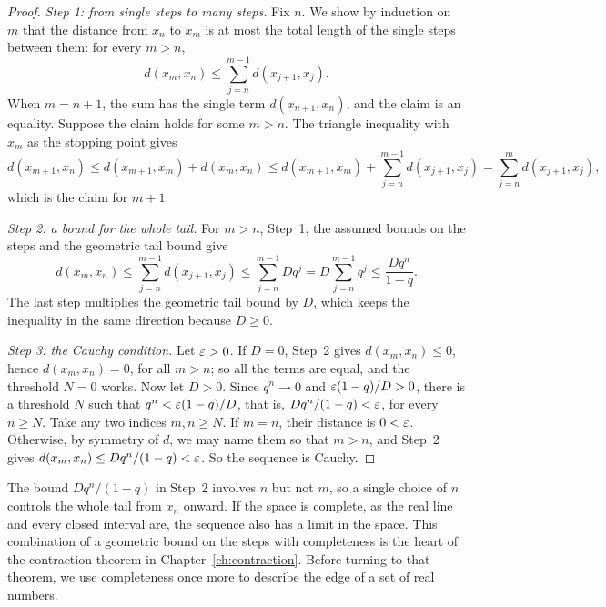\begin{proof}
\emph{Step 1: from single steps to many steps.} Fix $n$. We show by induction on $m$ that the distance from $x_n$ to $x_m$ is at most the total length of the single steps between them: for every $m>n$,
\[
d(x_m,x_n)\le\sum_{j=n}^{m-1}d(x_{j+1},x_j).
\]
When $m=n+1$, the sum has the single term $d(x_{n+1},x_n)$, and the claim is an equality. Suppose the claim holds for some $m>n$. The triangle inequality with $x_m$ as the stopping point gives
\[
d(x_{m+1},x_n)\le d(x_{m+1},x_m)+d(x_m,x_n)\le d(x_{m+1},x_m)+\sum_{j=n}^{m-1}d(x_{j+1},x_j)=\sum_{j=n}^{m}d(x_{j+1},x_j),
\]
which is the claim for $m+1$.

\emph{Step 2: a bound for the whole tail.} For $m>n$, Step~1, the assumed bounds on the steps and the geometric tail bound give
\[
d(x_m,x_n)\le\sum_{j=n}^{m-1}d(x_{j+1},x_j)\le\sum_{j=n}^{m-1}Dq^j=D\sum_{j=n}^{m-1}q^j\le\frac{Dq^n}{1-q}.
\]
The last step multiplies the geometric tail bound by $D$, which keeps the inequality in the same direction because $D\ge0$.

\emph{Step 3: the Cauchy condition.} Let $\varepsilon>0$. If $D=0$, Step~2 gives $d(x_m,x_n)\le0$, hence $d(x_m,x_n)=0$, for all $m>n$; so all the terms are equal, and the threshold $N=0$ works. Now let $D>0$. Since $q^n\to0$ and $\varepsilon(1-q)/D>0$, there is a threshold $N$ such that $q^n<\varepsilon(1-q)/D$, that is, $Dq^n/(1-q)<\varepsilon$, for every $n\ge N$. Take any two indices $m,n\ge N$. If $m=n$, their distance is $0<\varepsilon$. Otherwise, by symmetry of $d$, we may name them so that $m>n$, and Step~2 gives $d(x_m,x_n)\le Dq^n/(1-q)<\varepsilon$. So the sequence is Cauchy.
\end{proof}

The bound $Dq^n/(1-q)$ in Step~2 involves $n$ but not $m$, so a single choice of $n$ controls the whole tail from $x_n$ onward. If the space is complete, as the real line and every closed interval are, the sequence also has a limit in the space. This combination of a geometric bound on the steps with completeness is the heart of the contraction theorem in Chapter~\ref{ch:contraction}. Before turning to that theorem, we use completeness once more to describe the edge of a set of real numbers.

